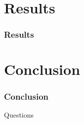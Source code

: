 \documentclass{beamer}
\begin{document}
\section{Results}

\begin{frame}
\frametitle{Results}
\end{frame}





\section{Conclusion}
\begin{frame}
\frametitle{Conclusion}

\end{frame}


\begin{frame}
\Huge{\centerline{Questions}}
\end{frame}
\end{document}
